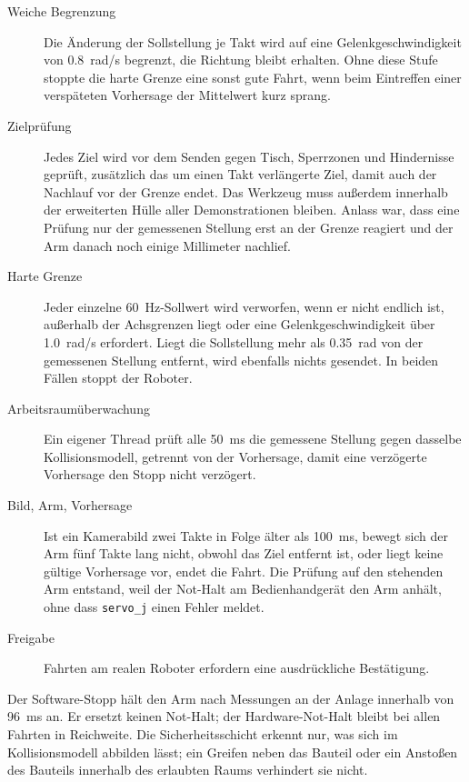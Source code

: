 \begin{description}
  \item[Weiche Begrenzung] Die Änderung der Sollstellung je Takt wird auf eine
    Gelenkgeschwindigkeit von \SI{0.8}{rad/s} begrenzt, die Richtung bleibt erhalten. Ohne diese
    Stufe stoppte die harte Grenze eine sonst gute Fahrt, wenn beim Eintreffen einer verspäteten
    Vorhersage der Mittelwert kurz sprang.
  \item[Zielprüfung] Jedes Ziel wird vor dem Senden gegen Tisch, Sperrzonen und Hindernisse
    geprüft, zusätzlich das um einen Takt verlängerte Ziel, damit auch der Nachlauf vor der Grenze
    endet. Das Werkzeug muss außerdem innerhalb der erweiterten Hülle aller Demonstrationen
    bleiben. Anlass war, dass eine Prüfung nur der gemessenen Stellung erst an der Grenze reagiert
    und der Arm danach noch einige Millimeter nachlief.
  \item[Harte Grenze] Jeder einzelne \SI{60}{\hertz}-Sollwert wird verworfen, wenn er nicht
    endlich ist, außerhalb der Achsgrenzen liegt oder eine Gelenkgeschwindigkeit über
    \SI{1.0}{rad/s} erfordert. Liegt die Sollstellung mehr als \SI{0.35}{rad} von der gemessenen
    Stellung entfernt, wird ebenfalls nichts gesendet. In beiden Fällen stoppt der Roboter.
  \item[Arbeitsraumüberwachung] Ein eigener Thread prüft alle \SI{50}{\milli\second} die
    gemessene Stellung gegen dasselbe Kollisionsmodell, getrennt von der Vorhersage, damit eine
    verzögerte Vorhersage den Stopp nicht verzögert.
  \item[Bild, Arm, Vorhersage] Ist ein Kamerabild zwei Takte in Folge älter als
    \SI{100}{\milli\second}, bewegt sich der Arm fünf Takte lang nicht, obwohl das Ziel entfernt
    ist, oder liegt keine gültige Vorhersage vor, endet die Fahrt. Die Prüfung auf den stehenden
    Arm entstand, weil der Not-Halt am Bedienhandgerät den Arm anhält, ohne dass
    \texttt{servo\_j} einen Fehler meldet.
  \item[Freigabe] Fahrten am realen Roboter erfordern eine ausdrückliche Bestätigung.
\end{description}

Der Software-Stopp hält den Arm nach Messungen an der Anlage innerhalb von
\SI{96}{\milli\second} an. Er ersetzt keinen Not-Halt; der Hardware-Not-Halt bleibt bei allen
Fahrten in Reichweite. Die Sicherheitsschicht erkennt nur, was sich im Kollisionsmodell abbilden
lässt; ein Greifen neben das Bauteil oder ein Anstoßen des Bauteils innerhalb des erlaubten Raums
verhindert sie nicht.

